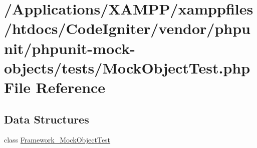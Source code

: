 \hypertarget{_mock_object_test_8php}{}\section{/\+Applications/\+X\+A\+M\+P\+P/xamppfiles/htdocs/\+Code\+Igniter/vendor/phpunit/phpunit-\/mock-\/objects/tests/\+Mock\+Object\+Test.php File Reference}
\label{_mock_object_test_8php}
\subsection*{Data Structures}
\begin{DoxyCompactItemize}
\item 
class \mbox{\hyperlink{class_framework___mock_object_test}{Framework\+\_\+\+Mock\+Object\+Test}}
\end{DoxyCompactItemize}
